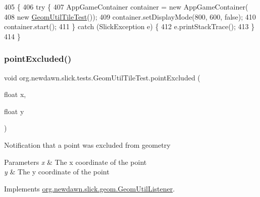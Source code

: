 \begin{DoxyCode}
405                                            \{
406         \textcolor{keywordflow}{try} \{
407             AppGameContainer container = \textcolor{keyword}{new} AppGameContainer(
408                     \textcolor{keyword}{new} \mbox{\hyperlink{classorg_1_1newdawn_1_1slick_1_1tests_1_1_geom_util_tile_test_a575c4c95de58e60fac79b507dceeae12}{GeomUtilTileTest}}());
409             container.setDisplayMode(800, 600, \textcolor{keyword}{false});
410             container.start();
411         \} \textcolor{keywordflow}{catch} (SlickException e) \{
412             e.printStackTrace();
413         \}
414     \}
\end{DoxyCode}
\mbox{\label{classorg_1_1newdawn_1_1slick_1_1tests_1_1_geom_util_tile_test_a64220cb1bcc1b44dccb00d04fbf77b26}} 
\subsubsection{\texorpdfstring{point\+Excluded()}{pointExcluded()}}
{\footnotesize\ttfamily void org.\+newdawn.\+slick.\+tests.\+Geom\+Util\+Tile\+Test.\+point\+Excluded (\begin{DoxyParamCaption}\item[{float}]{x,  }\item[{float}]{y }\end{DoxyParamCaption})\hspace{0.3cm}{\ttfamily [inline]}}

Notification that a point was excluded from geometry


\begin{DoxyParams}{Parameters}
{\em x} & The x coordinate of the point \\
\hline
{\em y} & The y coordinate of the point \\
\hline
\end{DoxyParams}


Implements \mbox{\hyperlink{interfaceorg_1_1newdawn_1_1slick_1_1geom_1_1_geom_util_listener_ab800520173f64c032206777411644b4c}{org.\+newdawn.\+slick.\+geom.\+Geom\+Util\+Listener}}.


